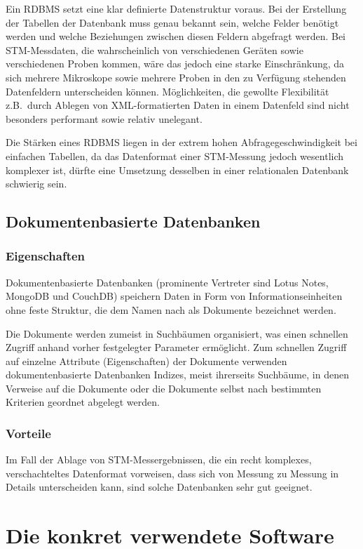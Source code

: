 \documentclass[12pt,ngerman,a4]{scrartcl}
\begin{document}
Ein RDBMS setzt eine klar definierte Datenstruktur voraus. Bei der Erstellung der Tabellen der Datenbank muss genau bekannt sein, welche Felder benötigt werden und welche Beziehungen zwischen diesen Feldern abgefragt werden. Bei STM-Messdaten, die wahrscheinlich von verschiedenen Geräten sowie verschiedenen Proben kommen, wäre das jedoch eine starke Einschränkung, da sich mehrere Mikroskope sowie mehrere Proben in den zu Verfügung stehenden Datenfeldern unterscheiden können. Möglichkeiten, die gewollte Flexibilität z.B.\ durch Ablegen von XML-formatierten Daten in einem Datenfeld sind nicht besonders performant sowie relativ unelegant.

Die Stärken eines RDBMS liegen in der extrem hohen Abfragegeschwindigkeit bei einfachen Tabellen, da das Datenformat einer STM-Messung jedoch wesentlich komplexer ist, dürfte eine Umsetzung desselben in einer relationalen Datenbank schwierig sein.
\subsection{Dokumentenbasierte Datenbanken}
\subsubsection{Eigenschaften}
Dokumentenbasierte Datenbanken (prominente Vertreter sind Lotus Notes, MongoDB und CouchDB) speichern Daten in Form von Informationseinheiten ohne feste Struktur, die dem Namen nach als Dokumente bezeichnet werden.

Die Dokumente werden zumeist in Suchbäumen organisiert, was einen schnellen Zugriff anhand vorher festgelegter Parameter ermöglicht. Zum schnellen Zugriff auf einzelne Attribute (Eigenschaften) der Dokumente verwenden dokumentenbasierte Datenbanken Indizes, meist ihrerseits Suchbäume, in denen Verweise auf die Dokumente oder die Dokumente selbst nach bestimmten Kriterien geordnet abgelegt werden.
\subsubsection{Vorteile}
Im Fall der Ablage von STM-Messergebnissen, die ein recht komplexes, verschachteltes Datenformat vorweisen, dass sich von Messung zu Messung in Details unterscheiden kann, sind solche Datenbanken sehr gut geeignet.

\section{Die konkret verwendete Software}
\end{document}

